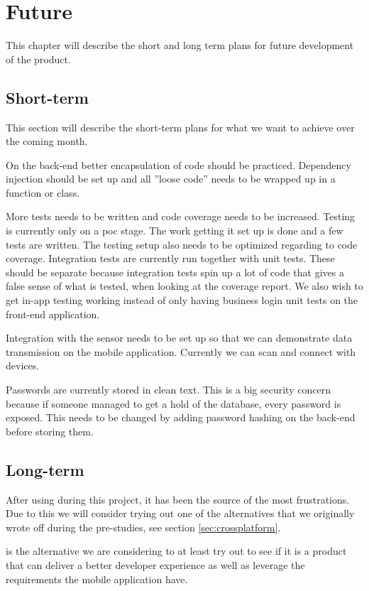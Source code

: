 \chapter{Future}
This chapter will describe the short and long term plans for future development of the product.

\section{Short-term}
This section will describe the short-term plans for what we want to achieve over the coming month.

On the back-end better encapsulation of code should be practiced.
Dependency injection should be set up and all ''loose code'' needs to be wrapped up in a function or class.

More tests needs to be written and code coverage needs to be increased.
Testing is currently only on a \gls{poc} stage. The work getting it set up is done and a few tests are written.
The testing setup also needs to be optimized regarding to code coverage.
Integration tests are currently run together with unit tests. 
These should be separate because integration tests spin up a lot of code that gives a false sense of what is tested, when looking at the coverage report.
We also wish to get in-app testing working instead of only having business login unit tests on the front-end application.

Integration with the  sensor needs to be set up so that we can demonstrate  data transmission on the mobile application.
Currently we can scan and connect with  devices.

Passwords are currently stored in clean text. 
This is a big security concern because if someone managed to get a hold of the database, every password is exposed. 
This needs to be changed by adding password hashing on the back-end before storing them.

\section{Long-term}
After using  during this project, it has been the source of the most frustrations.
Due to this we will consider trying out one of the alternatives that we originally wrote off during the pre-studies, see section \ref{sec:crossplatform}. 

 is the alternative we are considering to at least try out to see if it is a product that can deliver a better developer experience as well as leverage the requirements the mobile application have.

